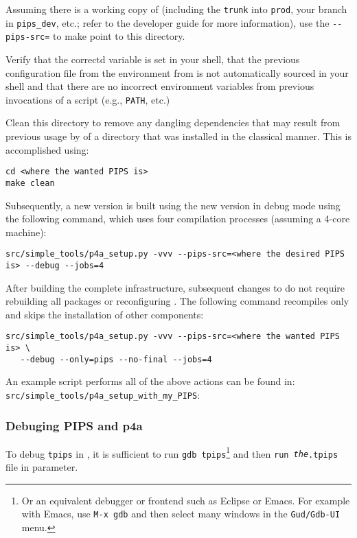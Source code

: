 \documentclass[a4paper]{article}
\begin{document}
Assuming there is a \Asvn working copy of \Apips (including the \texttt{trunk}
into \texttt{prod}, your branch in \verb|pips_dev|, etc.; refer
to the \Apips developer guide for more information), use the
\verb|--pips-src=| to make \Apfa point to this directory.

Verify that the correctd \Apfa variable is set in your shell, that
the previous configuration file from the \Apips \Asvn environment from
\Acri is not automatically sourced in your shell and that there are no
incorrect environment variables from previous invocations of a script
(e.g., \verb|PATH|, etc.)

Clean this directory to remove any dangling dependencies that may
result from previous
usage by \Apfa of a \Apips directory that was installed in the
classical manner. This is accomplished using:
\begin{verbatim}
cd <where the wanted PIPS is>
make clean
\end{verbatim}

Subsequently, a new \Apfa version is built using the new \Apips
version in debug mode using the following command, which uses
four compilation processes (assuming a 4-core machine):
\begin{verbatim}
src/simple_tools/p4a_setup.py -vvv --pips-src=<where the desired PIPS is> --debug --jobs=4
\end{verbatim}

After building the complete infrastructure, subsequent changes to
\Apips do not require rebuilding all packages or reconfiguring
\Apips. The following command recompiles \Apips only and skips the
installation of other \Apfa components:
\begin{verbatim}
src/simple_tools/p4a_setup.py -vvv --pips-src=<where the wanted PIPS is> \
   --debug --only=pips --no-final --jobs=4
\end{verbatim}

An example script performs all of the above actions can be found in:
\verb|src/simple_tools/p4a_setup_with_my_PIPS|:



\subsubsection{Debuging PIPS and p4a}
\label{sec:debuging-pips-p4a}

To debug \texttt{tpips} in \Apfa, it is sufficient to run \texttt{gdb
  tpips}\footnote{Or an equivalent debugger or frontend such as Eclipse or
  Emacs. For example with Emacs, use \texttt{M-x gdb} and then select
  many windows in the \texttt{Gud/Gdb-UI} menu.} and then \texttt{run
  \emph{the}.tpips} file in parameter.
\end{document}
